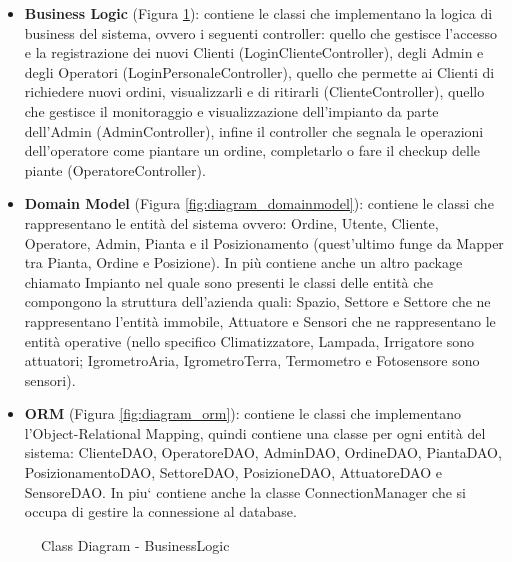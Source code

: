 \documentclass{article}
\begin{document}
\begin{itemize}
    \item \textbf{Business Logic} (Figura \ref{fig:diagram_businesslogic}): contiene le classi che implementano la logica di business del sistema, ovvero i seguenti controller: quello che gestisce l’accesso e la registrazione dei nuovi Clienti (LoginClienteController), degli Admin e degli Operatori (LoginPersonaleController), quello che permette ai Clienti di richiedere nuovi ordini, visualizzarli e di ritirarli (ClienteController), quello che gestisce il monitoraggio e visualizzazione dell'impianto da parte dell'Admin (AdminController), infine il controller che segnala le operazioni dell'operatore come piantare un ordine, completarlo o fare il checkup delle piante (OperatoreController).
    \item \textbf{Domain Model} (Figura \ref{fig:diagram_domainmodel}): contiene le classi che rappresentano le entità del sistema ovvero: Ordine, Utente, Cliente, Operatore, Admin, Pianta e il Posizionamento (quest'ultimo funge da Mapper tra Pianta, Ordine e Posizione). In più contiene anche un altro package chiamato Impianto nel quale sono presenti le classi delle entità che compongono la struttura dell'azienda quali: Spazio, Settore e Settore che ne rappresentano l'entità immobile, Attuatore e Sensori che ne rappresentano le entità operative (nello specifico Climatizzatore, Lampada, Irrigatore sono attuatori; IgrometroAria, IgrometroTerra, Termometro e Fotosensore sono sensori).
    \item \textbf{ORM} (Figura \ref{fig:diagram_orm}): contiene le classi che implementano l’Object-Relational Mapping, quindi contiene una classe per ogni entità del sistema: ClienteDAO, OperatoreDAO, AdminDAO, OrdineDAO, PiantaDAO, PosizionamentoDAO, SettoreDAO, PosizioneDAO, AttuatoreDAO e SensoreDAO. In piu` contiene anche la classe ConnectionManager che si occupa di gestire la connessione al database.
\end{itemize}
\begin{figure}[H]
    \centering
    \caption{Class Diagram - BusinessLogic}
    \label{fig:diagram_businesslogic}
\end{figure}
\end{document}
